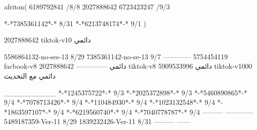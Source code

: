 afriton(
6189792841 /8/8
2027888642
6723423247 /9/3

*-*7385361142*-* 8/31
*-*6213748174*-* 9/1
)

2027888642 tiktok-v10
دائمي

5586864132-no-ses-13
8/29
7385361142-no-se-13
9/7
------------
5754454119 facbook-v8
دائمي
--------------
2027888642 tiktok-v8
دائمي
5909533996 tiktok-v1000
دائمي مع التحديث

__________
*-*1245375722*-* 9/3
*-*2025372898*-* 9/3
*-*5460890865*-* 9/4
*-*7078713426*-* 9/4
*-*110484930*-* 9/4
*-*1023132548*-* 9/4
*-*1863597107*-* 9/4
*-*6219560740*-* 9/4
*-*7040778787*-* 9/4
---------
------------
5489187359-Ver-11
8/29
1839232426-Ver-11
8/31
---------
------
